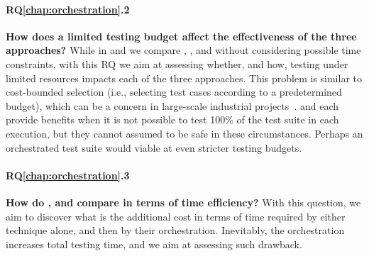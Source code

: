 \paragraph{RQ\ref{chap:orchestration}.2}\label{rq:orch2} \textbf{How does a limited testing budget affect the effectiveness of the three approaches?}
While in  and  we compare \ek, \fs, and \fz without considering possible time constraints, with this RQ we aim at assessing whether, and how, testing under limited resources impacts each of the three approaches. 
This problem is similar to cost-bounded selection \cite{cibulski2011regression} (i.e., selecting
test cases according to a predetermined budget), which can be a concern in large-scale industrial projects~\cite{elbaum2014techniques}. 
\tcs and \tcp each provide benefits when it is not possible to test 100\% of the test suite in each execution, but they cannot assumed to be safe in these circumstances.
Perhaps an orchestrated test suite would viable at even stricter testing budgets.

\paragraph{RQ\ref{chap:orchestration}.3}\label{rq:orch3} \textbf{How do \ek, \fs and \fz compare in terms of time efficiency?}
With this question, we aim to discover what is the additional cost in terms of time required by either technique alone, and then by their orchestration.
Inevitably, the orchestration increases total testing time, and we aim at assessing such drawback.
